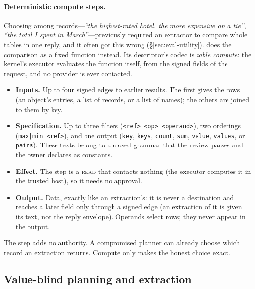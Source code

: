 \documentclass[letterpaper,twocolumn,10pt]{article}
\newcommand{\code}[1]{\texttt{\detokenize{#1}}}
\newcommand{\READ}{\textsc{read}}
\begin{document}
\paragraph{Deterministic compute steps.}
\label{sec:compute}
Choosing among records---\emph{``the highest-rated hotel, the more
expensive on a tie''}, \emph{``the total I spent in March''}---previously
required an extractor to compare whole tables in one reply, and it often
got this wrong (\S\ref{sec:eval-utility}). \code{dojo.compute.table} does
the comparison as a fixed function instead. Its descriptor's codec is
\emph{table compute}: the kernel's executor evaluates the function itself,
from the signed fields of the request, and no provider is ever contacted.
\begin{itemize}
\item \textbf{Inputs.} Up to four signed edges to earlier results. The
  first gives the rows (an object's entries, a list of records, or a list
  of names); the others are joined to them by key.
\item \textbf{Specification.} Up to three filters
  (\texttt{<ref> <op> <operand>}), two orderings (\texttt{max|min <ref>}),
  and one output (\texttt{key}, \texttt{keys}, \texttt{count},
  \texttt{sum}, \texttt{value}, \texttt{values}, or \texttt{pairs}). These
  texts belong to a closed grammar that the review parses and the owner
  declares as constants.
\item \textbf{Effect.} The step is a \READ{} that contacts nothing (the
  executor computes it in the trusted host), so it
  needs no approval.
\item \textbf{Output.} Data, exactly like an extraction's: it is never a
  destination and reaches a later field only through a signed edge (an
  extraction of it is given its text, not the reply envelope).
  Operands select rows; they never appear in the output.
\end{itemize}
The step adds no authority. A compromised planner can already choose which
record an extraction returns. Compute only makes the honest choice exact.

\subsection{Value-blind planning and extraction}
\label{sec:blind}
\end{document}
